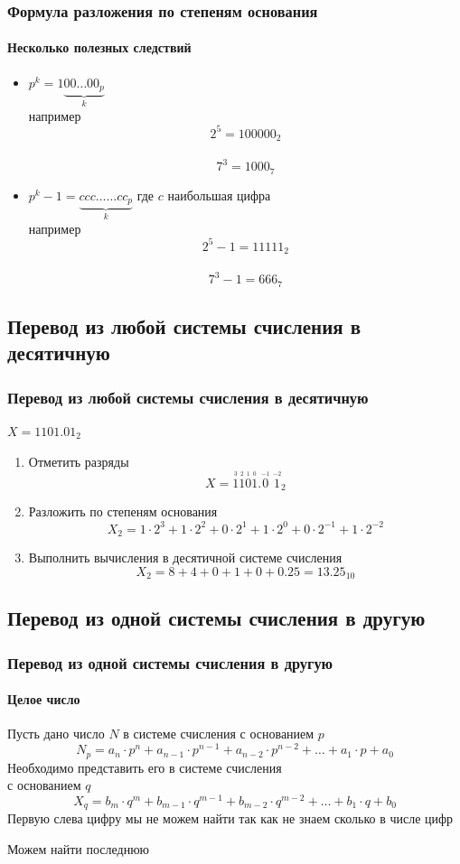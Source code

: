 \begin{frame}
  \frametitle{Формула разложения по степеням основания}
	\framesubtitle{Несколько полезных следствий}
	\begin{itemize}
		\item $ p^k=1\underbrace{00 \ldots 00_p}_{k} $\\
		например $$2^5=100000_2$$\\
		         $$7^3=1000_7$$
		\item $ p^k-1=\underbrace{ccc\ldots\ldots cc_p}_{k} $ где $c$ наибольшая цифра\\
		например $$2^5-1=11111_2$$\\
		         $$7^3-1=666_7$$
	\end{itemize}
	
\end{frame}

\subsection{Перевод из любой системы счисления в десятичную}
\begin{frame}
  \frametitle{Перевод из любой системы счисления в десятичную}
	
	$ X=1101.01_2	$

	\begin{enumerate}
	\item Отметить разряды
	$$
	   X=\overset{\overset{3}{}}{1}\overset{\overset{2}{}}{1}\overset{\overset{1}{}}{0}\overset{\overset{0}{}}{1}.\overset{\overset{-1}{}}{0}\;\overset{\overset{-2}{}}{1}_2
	$$
	\item Разложить по степеням основания
		$$
  X_2 = 1\cdot 2^3 + 1\cdot 2^2 + 0\cdot 2^1 + 1\cdot 2^0 + 0\cdot 2^{-1} + 1\cdot 2^{-2} 
	$$
	\item Выполнить вычисления в десятичной системе счисления
	$$
  X_2 = 8+4+0+1+0+0.25=13.25_{10} 
	$$
	\end{enumerate}
  
	
	
	
	
\end{frame}

\subsection{Перевод из одной системы счисления в другую}
\begin{frame}
  \frametitle{Перевод из одной системы счисления в другую}
	\framesubtitle{Целое число}
	Пусть дано число $N$ в системе счисления с основанием $p$
	$$
	N_p=a_{n}\cdot p^{n}+a_{n-1}\cdot p^{n-1}+a_{n-2}\cdot p^{n-2}+\ldots + a_{1}\cdot p+a_0
	$$	
	Необходимо представить его в системе счисления \\ с основанием $q$
	$$
	X_q=b_{m}\cdot q^{m}+b_{m-1}\cdot q^{m-1}+b_{m-2}\cdot q^{m-2}+\ldots + b_{1}\cdot q+b_0
	$$	
	\pause
	Первую слева цифру мы не можем найти так как не знаем сколько в числе цифр
	
	\pause
	Можем найти последнюю
	
	
\end{frame}

